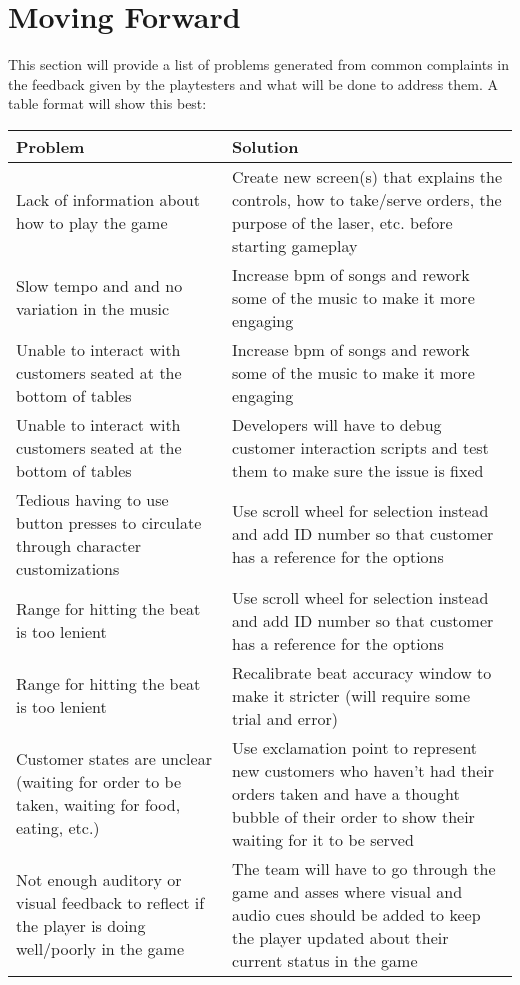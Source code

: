 \documentclass[twoside,twocolumn]{article}
\begin{document}
\section{Moving Forward}
This section will provide a list of problems generated from common complaints in the feedback given
by the playtesters and what will be done to address them. A table format will show this best:
\begin{tabularx}{\textwidth}{ |X|X| }
    \hline
    Problem & Solution  \\ \hline
    Lack of information about how to play the game & 
    Create new screen(s) that explains the controls, how to take/serve orders, the purpose of the laser, etc. before starting gameplay
    \\ \hline
    Slow tempo and and no variation in the music & Increase bpm of songs and rework some of the music to make it more engaging
    \\ \hline
    Unable to interact with customers seated at the bottom of tables & 
    Increase bpm of songs and rework some of the music to make it more engaging
    \\
    \hline
    Unable to interact with customers seated at the bottom of tables &
    Developers will have to debug customer interaction scripts and test them to make sure the issue is fixed
    \\ \hline
    Tedious having to use button presses to circulate through character customizations
    &
    Use scroll wheel for selection instead and add ID number so that customer has a reference for the options
    \\ \hline
    Range for hitting the beat is too lenient
    &
    Use scroll wheel for selection instead and add ID number so that customer has a reference for the options
    \\ \hline
    Range for hitting the beat is too lenient &
    Recalibrate beat accuracy window to make it stricter (will require some trial and error)
    \\ \hline
    Customer states are unclear (waiting for order to be taken, waiting for food, eating, etc.) &
    Use exclamation point to represent new customers who haven’t had their orders taken and have a thought bubble of their order to show their waiting for it to be served
    \\ \hline
    Not enough auditory or visual feedback to reflect if the player is doing well/poorly in the game
    &
    The team will have to go through the game and asses where visual and audio cues should be added to keep the player updated about their current status in the game
    \\ \hline

    \end{tabularx}
\end{document}
